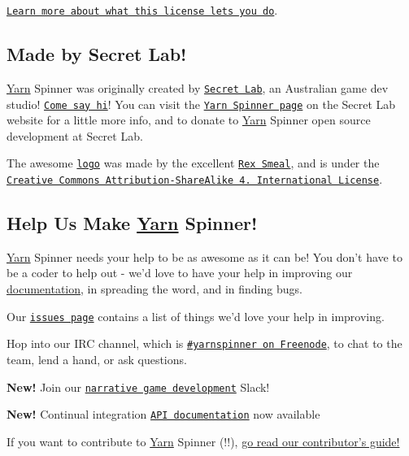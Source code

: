 \begin{DoxyItemize}
\item \href{https://tldrlegal.com/license/mit-license}{\tt Learn more about what this license lets you do}.
\end{DoxyItemize}

\subsection*{Made by Secret Lab!}

\hyperlink{a00026}{Yarn} Spinner was originally created by \href{http://secretlab.com.au}{\tt Secret Lab}, an Australian game dev studio! \href{https://twitter.com/thesecretlab}{\tt Come say hi}! You can visit the \href{http://www.secretlab.com.au/yarnspinner}{\tt Yarn Spinner page} on the Secret Lab website for a little more info, and to donate to \hyperlink{a00026}{Yarn} Spinner open source development at Secret Lab.

The awesome \href{Documentation/YarnSpinnerLogo.png}{\tt logo} was made by the excellent \href{https://twitter.com/RexSmeal}{\tt Rex Smeal}, and is under the \href{http://creativecommons.org/licenses/by-sa/4.0/}{\tt Creative Commons Attribution-\/\-Share\-Alike 4. International License}.

\subsection*{Help Us Make \hyperlink{a00026}{Yarn} Spinner!}

\hyperlink{a00026}{Yarn} Spinner needs your help to be as awesome as it can be! You don't have to be a coder to help out -\/ we'd love to have your help in improving our \hyperlink{a00012}{documentation}, in spreading the word, and in finding bugs.


\begin{DoxyItemize}
\item Our \href{https://github.com/thesecretlab/YarnSpinner/issues}{\tt issues page} contains a list of things we'd love your help in improving.
\item Hop into our I\-R\-C channel, which is \href{https://webchat.freenode.net/?channels=yarnspinner}{\tt \#yarnspinner on Freenode}, to chat to the team, lend a hand, or ask questions.
\item {\bfseries New!} Join our \href{http://lab.to/narrativegamedev}{\tt narrative game development} Slack!
\item {\bfseries New!} Continual integration \href{https://thesecretlab.github.io/YarnSpinner/html/}{\tt A\-P\-I documentation} now available
\end{DoxyItemize}

If you want to contribute to \hyperlink{a00026}{Yarn} Spinner (!!), \hyperlink{a00002}{go read our contributor's guide!} 